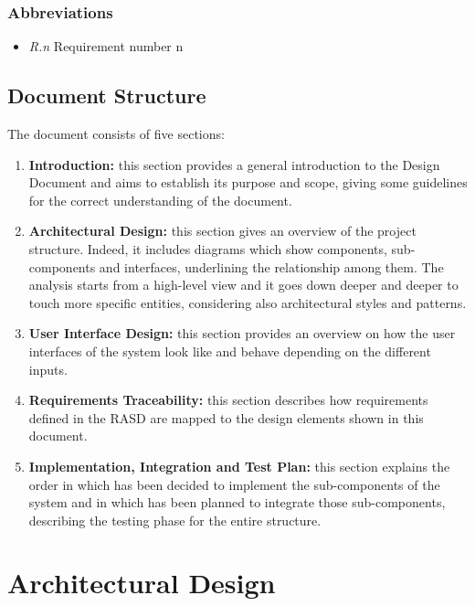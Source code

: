 \documentclass[a4paper]{article}
\begin{document}
\subsubsection{Abbreviations}
\begin{itemize}
    \item \textit{R.n} Requirement number n
\end{itemize}
\clearpage    


\subsection{Document Structure}
The document consists of five sections:
\begin{enumerate}[label*=\bf{\arabic*.}]
    \item \textbf{Introduction:} this section provides a general introduction to the Design Document and aims to establish its purpose and scope, giving some guidelines for the correct understanding of the document.
    \item \textbf{Architectural Design:} this section gives an overview of the project structure. Indeed, it includes diagrams which show components, sub-components and interfaces, underlining the relationship among them. The analysis starts from a high-level view and it goes down deeper and deeper to touch more specific entities, considering also architectural styles and patterns.  
    \item \textbf{User Interface Design:} this section provides an overview on how the user interfaces of the system look like and behave depending on the different inputs.
    \item \textbf{Requirements Traceability:} this section describes how requirements defined in the RASD are mapped to the design elements shown in this document.
    \item \textbf{Implementation, Integration and Test Plan:} this section explains the order in which has been decided to implement the sub-components of the system and in which has been planned to integrate those sub-components, describing the testing phase for the entire structure.
\end{enumerate}

\clearpage

\section{Architectural Design}
\end{document}
